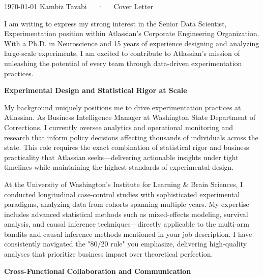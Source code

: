 \documentclass[10.5pt, letterpaper]{russell}
\begin{document}
\makecvheader[R]

\makecvfooter
{\today}
{Kambiz Tavabi~~~·~~~Cover Letter}
{\thepage}

\makelettertitle

\begin{cvletter}
  I am writing to express my strong interest in the Senior Data Scientist, Experimentation position within Atlassian's Corporate Engineering Organization. With a Ph.D. in Neuroscience and 15 years of experience designing and analyzing large-scale experiments, I am excited to contribute to Atlassian's mission of unleashing the potential of every team through data-driven experimentation practices.

  \textbf{Experimental Design and Statistical Rigor at Scale}

  My background uniquely positions me to drive experimentation practices at Atlassian. As Business Intelligence Manager at Washington State Department of Corrections, I currently oversee analytics and operational monitoring and research that inform policy decisions affecting thousands of individuals across the state. This role requires the exact combination of statistical rigor and business practicality that Atlassian seeks—delivering actionable insights under tight timelines while maintaining the highest standards of experimental design.

  At the University of Washington's Institute for Learning \& Brain Sciences, I conducted longitudinal case-control studies with sophisticated experimental paradigms, analyzing data from cohorts spanning multiple years. My expertise includes advanced statistical methods such as mixed-effects modeling, survival analysis, and causal inference techniques—directly applicable to the multi-arm bandits and causal inference methods mentioned in your job description. I have consistently navigated the "80/20 rule" you emphasize, delivering high-quality analyses that prioritize business impact over theoretical perfection.

  \textbf{Cross-Functional Collaboration and Communication}


\end{cvletter}
\end{document}
